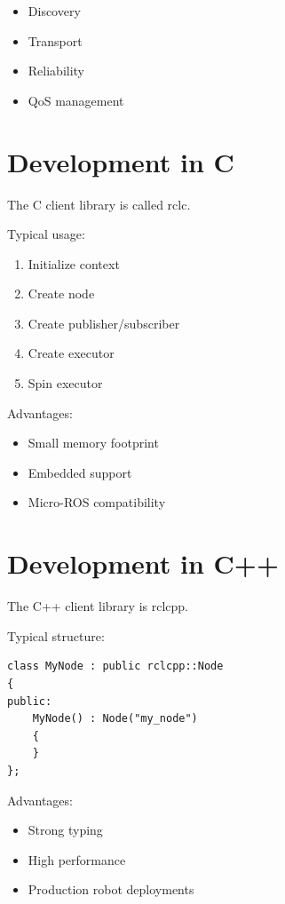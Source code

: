 \documentclass[11pt]{article}
\begin{document}
\begin{itemize}
\item Discovery
\item Transport
\item Reliability
\item QoS management
\end{itemize}

\section{Development in C}

The C client library is called rclc.

Typical usage:

\begin{enumerate}
\item Initialize context
\item Create node
\item Create publisher/subscriber
\item Create executor
\item Spin executor
\end{enumerate}

Advantages:

\begin{itemize}
\item Small memory footprint
\item Embedded support
\item Micro-ROS compatibility
\end{itemize}

\section{Development in C++}

The C++ client library is rclcpp.

Typical structure:

\begin{verbatim}
class MyNode : public rclcpp::Node
{
public:
    MyNode() : Node("my_node")
    {
    }
};
\end{verbatim}

Advantages:

\begin{itemize}
\item Strong typing
\item High performance
\item Production robot deployments
\end{itemize}
\end{document}
